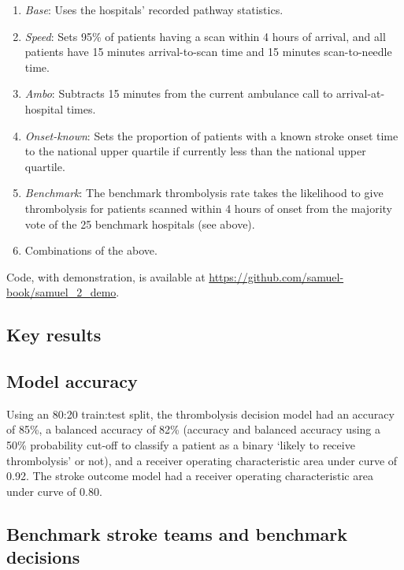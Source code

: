 \begin{enumerate}

    \item \textit{Base}: Uses the hospitals’ recorded pathway statistics.

    \item \textit{Speed}: Sets 95\% of patients having a scan within 4 hours of arrival, and all patients have 15 minutes arrival-to-scan time and 15 minutes scan-to-needle time.

    \item \textit{Ambo}: Subtracts 15 minutes from the current ambulance call to arrival-at-hospital times.

    \item  \textit{Onset-known}: Sets the proportion of patients with a known stroke onset time to the national upper quartile if currently less than the national upper quartile.

    \item \textit{Benchmark}: The benchmark thrombolysis rate takes the likelihood to give thrombolysis for patients scanned within 4 hours of onset from the majority vote of the 25 benchmark hospitals (see above).

    \item Combinations of the above.

\end{enumerate}

Code, with demonstration, is available at \url{https://github.com/samuel-book/samuel_2_demo}.


\subsection{Key results}

\subsection{Model accuracy}

Using an 80:20 train:test split, the thrombolysis decision model had an accuracy of 85\%, a balanced accuracy of 82\% (accuracy and balanced accuracy using a 50\% probability cut-off to classify a patient as a binary `likely to receive thrombolysis' or not), and a receiver operating characteristic area under curve of 0.92. The stroke outcome model had a receiver operating characteristic area under curve of 0.80.

\subsection{Benchmark stroke teams and benchmark decisions}

